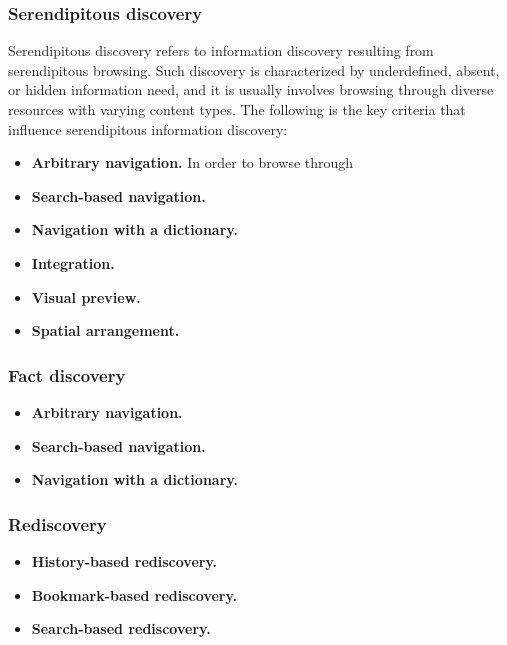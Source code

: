 \documentclass{casconpaper}
\begin{document}
{\subsubsection{Serendipitous discovery}
Serendipitous discovery refers to information discovery resulting from serendipitous  browsing. Such discovery is characterized by underdefined, absent, or hidden information need, and it is usually involves browsing through diverse resources with varying content types. The following is the key criteria that influence serendipitous information discovery:

\begin{itemize}
  \item \textbf{Arbitrary navigation.} In order to browse through 
  \item \textbf{Search-based navigation.}
  \item \textbf{Navigation with a dictionary.}
  \item \textbf{Integration.}
  \item \textbf{Visual preview.}
  
  \item \textbf{Spatial arrangement.}
  
\end{itemize}


} %

{\subsubsection{Fact discovery}
\begin{itemize}
  \item \textbf{Arbitrary navigation.} 
  \item \textbf{Search-based navigation.}
  \item \textbf{Navigation with a dictionary.}
\end{itemize}

} %

{\subsubsection{Rediscovery}
\begin{itemize}
  \item \textbf{History-based rediscovery.} 
  \item \textbf{Bookmark-based rediscovery.}
  \item \textbf{Search-based rediscovery.}
\end{itemize}
} %
\end{document}
